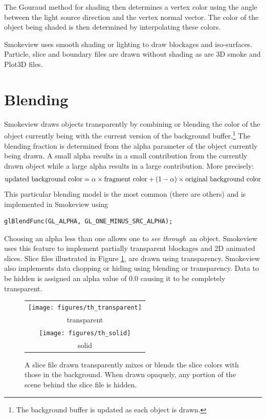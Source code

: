 \documentclass[11pt,twoside]{book}
\begin{document}
The Gouraud method for shading then determines a vertex color
using the angle between the light source direction and the vertex
normal vector. The color of the object being shaded is then
determined by interpolating these colors.

Smokeview uses smooth shading or lighting to draw blockages and
iso-surfaces. Particle, slice and boundary files are drawn without
shading as are 3D smoke and Plot3D files.


\section{Blending}
Smokeview draws objects transparently by combining or blending the color of the object currently being with the current version of the background buffer.\footnote{The background buffer is updated as each object is drawn.}
The blending fraction is determined from the alpha parameter of the object currently being drawn.
A small alpha results in a small contribution from the currently drawn object while a large alpha results in a large contribution.  More precisely:
\begin{eqnarray*}
\noindent\mbox{updated background color} = \alpha\times \mbox{fragment color} + (1-\alpha)\times \mbox{original background color}
\end{eqnarray*}
This particular blending model is the most common (there are others) and is implemented in Smokeview using
\begin{verbatim}
glBlendFunc(GL_ALPHA, GL_ONE_MINUS_SRC_ALPHA);
\end{verbatim}

Choosing an alpha less than one allows one to
{\em see through}\ an object. Smokeview uses this feature to implement
partially transparent blockages and 2D animated slices.
Slice files illustrated in Figure
\ref{figtransparent}, are drawn using transparency. Smokeview also implements
data chopping or hiding using blending or transparency.  Data to be hidden is assigned an alpha
value of 0.0 causing it to be completely transparent.

\begin{figure}[t]
\begin{center}
\begin{tabular}{c}
\texttt{[image: figures/th\_transparent]}\\
transparent\\
\texttt{[image: figures/th\_solid]}\\
solid\\
\end{tabular}
\end{center}
\caption {A slice file drawn transparently mixes or blends the
slice colors with those in the background.  When drawn opaquely,
any portion of the scene behind the slice file is hidden. }
\label{figtransparent}
\end{figure}
\end{document}
